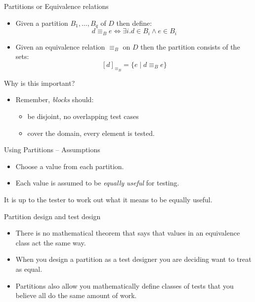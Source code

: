\documentclass{beamer}
\begin{document}
\begin{frame}{Partitions or Equivalence relations} 
  \begin{itemize}
  \item Given a partition $B_1,\ldots ,  B_q$ of $D$ then define:
    \[
      d \equiv_B e \Leftrightarrow \exists i. d \in B_i \land e \in B_i
    \]
  \item Given an equivalence relation $\equiv_B$ on $D$ then the
    partition consists of the sets:
    \[
    [d]_{\equiv_B} = \{ e \mid d \equiv_B e \}
    \]  
  \end{itemize}
  
\end{frame}
\begin{frame}{Why is this important?}
  \begin{itemize}
  \item Remember, {\it blocks} should: 
    \begin{itemize}
    \item be disjoint, no overlapping test cases
    \item cover the domain, every element is tested.
    \end{itemize}
  \end{itemize}  
\end{frame}
\begin{frame}{Using Partitions -- Assumptions}
  \begin{itemize}
  \item Choose a value from each partition.
  \item Each value is assumed to be {\em equally useful} for testing.
  \end{itemize}
It is up to the tester to work out what it means to be equally useful.
\end{frame}
\begin{frame}{Partition design and test design}
  \begin{itemize}
  \item There is no mathematical theorem that says that values in an
    equivalence class act the same way.
  \item When you design a partition as a test designer you are
    deciding want to treat as equal.
  \item Partitions also allow you mathematically define classes of
    tests that you believe all do the same amount of work.
  \end{itemize}
\end{frame}
\end{document}
